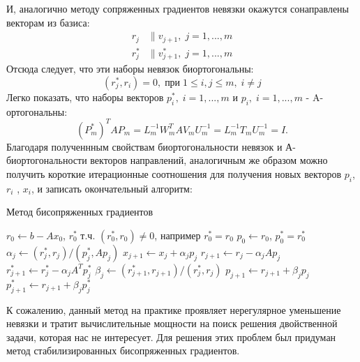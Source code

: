 И, аналогично методу сопряженных градиентов невязки окажутся сонаправлены векторам из базиса:
\begin{align*}
    r_j &\parallel v_{j+1},\;j=1,...,m \\
    r_j^* &\parallel v_{j+1}^*,\;j=1,...,m
\end{align*}
Отсюда следует, что эти наборы невязок биортогональны:
\begin{equation}
    \label{eq:rjrieq0}
    (r_j^*,r_i) = 0,\;\text{при}\;1 \leq i,j \leq m,\;i \neq j
\end{equation}
Легко показать, что наборы векторов $p_i^*,\;i=1,...,m$ и $p_i,\;i=1,...,m$ - A-ортогональны:
\begin{equation*}
    (P_m^*)^T A P_m = L_m^{-1} W_m^T A V_m U_m^{-1} = L_m^{-1} T_m U_m^{-1} = I.
\end{equation*}
Благодаря полученнным свойствам биортогональности невязок и А-биортогональности
векторов направлений, аналогичным же образом можно получить короткие итерационные соотношения для получения новых векторов 
$p_i$, $r_i$ , $x_i$, и записать окончательный алгоритм:
\begin{algorithm}
    \caption{Метод бисопряженных градиентов}
    \begin{algorithmic}[1]
    \State $r_0 \gets b - A x_0$, $r_0^*$ т.ч. $(r_0^*,r_0) \neq 0$, например $r_0^*=r_0$ 
    \State $p_0 \gets r_0$, $p_0^*=r_0^*$
        \State $\alpha_j \gets (r_j^*, r_j) / (p_j^*, A p_j)$
        \State $x_{j+1} \gets x_j + \alpha_j p_j$
        \State $r_{j+1} \gets r_j - \alpha_j A p_j$
        \State $r_{j+1}^* \gets r_j^* - \alpha_j A^T p_j^*$
        \State $\beta_j \gets (r_{j+1}^*, r_{j+1}) / (r_j^*, r_j)$
        \State $p_{j+1} \gets r_{j+1} + \beta_j p_j$
        \State $p_{j+1}^* \gets r_{j+1} + \beta_j p_j^*$
    \EndFor
    \end{algorithmic}
\end{algorithm}
К сожалению, данный метод на практике проявляет нерегулярное уменьшение невязки и 
тратит вычислительные мощности на поиск решения двойственной задачи, которая нас не интересует.
Для решения этих проблем был придуман метод стабилизированных бисопряженных градиентов.

